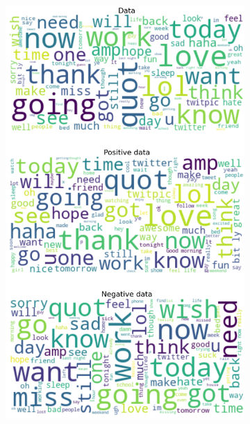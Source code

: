 \documentclass{article}
\begin{document}
\begin{itemize}
\begin{figure}[H]
\centering
\captionsetup{justification=centering}
\begin{subfigure}[b]{0.24\textwidth}
\centering
\includegraphics[width=\textwidth]{chapter-06/section-01-01/13/visualization/1/wordcloud.png}
\end{subfigure}
\begin{subfigure}[b]{0.24\textwidth}
\centering

\end{subfigure}
\end{figure}
\end{itemize}
\end{document}
